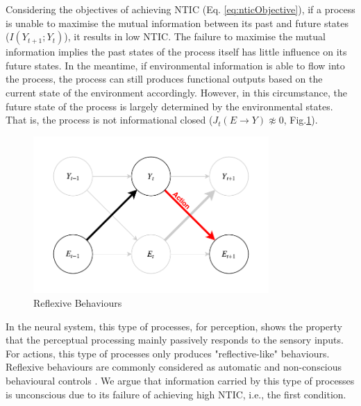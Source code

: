 \documentclass[utf8]{article}
\begin{document}
        	Considering the objectives of achieving NTIC (Eq. \ref{eq:nticObjective}), if a process is unable to maximise the mutual information between its past and future states ($I(Y_{t+1};Y_{t})$), it results in low NTIC. The failure to maximise the mutual information implies the past states of the process itself has little influence on its future states. In the meantime, if environmental information is able to flow into the process, the process can still produces functional outputs based on the current state of the environment accordingly. However, in this circumstance, the future state of the process is largely determined by the environmental states. That is, the process is not informational closed (${J_{t}(E \rightarrow Y )} \not\approx 0$, Fig.\ref{fig:reflexive}). 
            	
            	
                
    		\begin{figure}[H]
    			\includegraphics[width=0.8\textwidth]{WritingMaterials/Fig_Reflexive/Reflexive.pdf}
    			\caption{Reflexive Behaviours}
    			\label{fig:reflexive}
    		\end{figure}        
            
            In the neural system, this type of processes, for perception, shows the property that the perceptual processing mainly passively responds to the sensory inputs. For actions, this type of processes only produces "reflective-like" behaviours. Reflexive behaviours are commonly considered as automatic and non-conscious behavioural controls \citep{casali2013theoretically}. We argue that information carried by this type of processes is unconscious due to its failure of achieving high NTIC, i.e., the first condition. 
            
\end{document}
